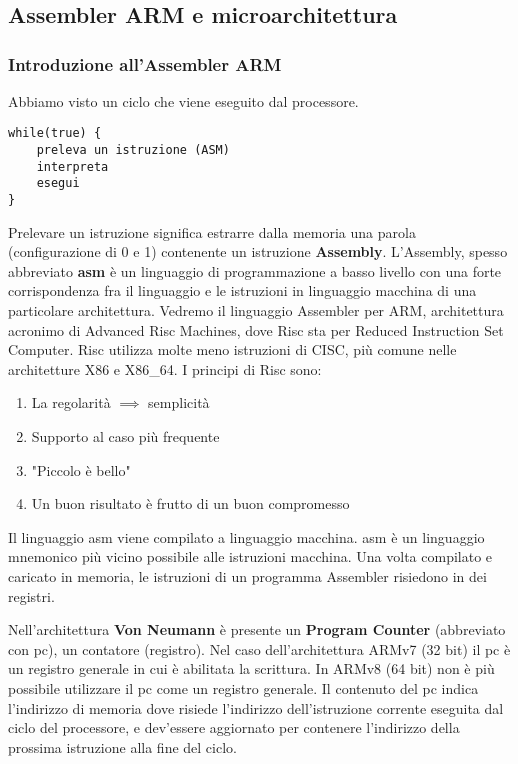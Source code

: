 \part{}
\chapter{Assembler ARM e microarchitettura}

\section{Introduzione all'Assembler ARM}

Abbiamo visto un ciclo che viene eseguito dal processore.
\begin{lstlisting}
while(true) {
	preleva un istruzione (ASM)
	interpreta
	esegui
}
\end{lstlisting}

\begin{defn}
Prelevare un istruzione significa estrarre dalla memoria una parola (configurazione di 0 e 1) contenente un istruzione \textbf{Assembly}. L'Assembly, spesso abbreviato \textbf{asm} è un linguaggio di programmazione a basso livello con una forte corrispondenza fra il linguaggio e le istruzioni in linguaggio macchina di una particolare architettura. Vedremo il linguaggio Assembler per ARM, architettura acronimo di Advanced Risc Machines, dove Risc sta per Reduced Instruction Set Computer. Risc utilizza molte meno istruzioni di CISC, più comune nelle architetture X86 e X86\_64. I principi di Risc sono:
\begin{enumerate}
	\item La regolarità $ \implies $ semplicità
	\item Supporto al caso più frequente
	\item "Piccolo è bello"
	\item Un buon risultato è frutto di un buon compromesso
\end{enumerate}

Il linguaggio asm viene compilato a linguaggio macchina. asm è un linguaggio mnemonico più vicino possibile alle istruzioni macchina. Una volta compilato e caricato in memoria, le istruzioni di un programma Assembler risiedono in dei registri.
\end{defn}

\begin{defn}
Nell'architettura \textbf{Von Neumann} è presente un \textbf{Program Counter} (abbreviato con pc), un contatore (registro). Nel caso dell'architettura ARMv7 (32 bit) il pc è un registro generale in cui è abilitata la scrittura. In ARMv8 (64 bit) non è più possibile utilizzare il pc come un registro generale. Il contenuto del pc indica l'indirizzo di memoria dove risiede l'indirizzo dell'istruzione corrente eseguita dal ciclo del processore, e dev'essere aggiornato per contenere l'indirizzo della prossima istruzione alla fine del ciclo.
\end{defn}

